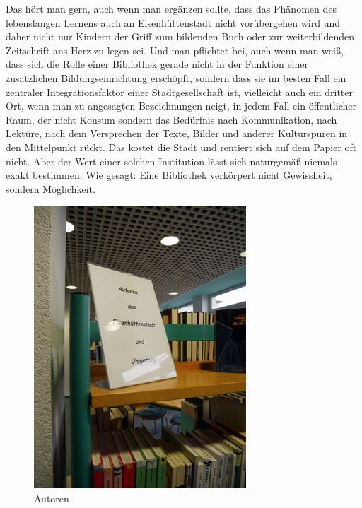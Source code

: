 \documentclass[a4paper,
fontsize=11pt,
oneside,
numbers=noperiodatend,
parskip=half-,
bibliography=totoc,
final
]{scrartcl}
\begin{document}
Das hört man gern, auch wenn man ergänzen sollte, dass das Phänomen des
lebenslangen Lernens auch an Eisenhüttenstadt nicht vorübergehen wird
und daher nicht nur Kindern der Griff zum bildenden Buch oder zur
weiterbildenden Zeitschrift ans Herz zu legen sei. Und man pflichtet
bei, auch wenn man weiß, dass sich die Rolle einer Bibliothek gerade
nicht in der Funktion einer zusätzlichen Bildungseinrichtung erschöpft,
sondern dass sie im besten Fall ein zentraler Integrationsfaktor einer
Stadtgesellschaft ist, vielleicht auch ein dritter Ort, wenn man zu
angesagten Bezeichnungen neigt, in jedem Fall ein öffentlicher Raum, der
nicht Konsum sondern das Bedürfnis nach Kommunikation, nach Lektüre,
nach dem Versprechen der Texte, Bilder und anderer Kulturspuren in den
Mittelpunkt rückt. Das kostet die Stadt und rentiert sich auf dem Papier
oft nicht. Aber der Wert einer solchen Institution lässt sich naturgemäß
niemals exakt bestimmen. Wie gesagt: Eine Bibliothek verkörpert nicht
Gewissheit, sondern Möglichkeit.

\begin{figure}
\centering
\includegraphics{img/image_5.jpg}
\caption{Autoren}
\end{figure}
\end{document}
